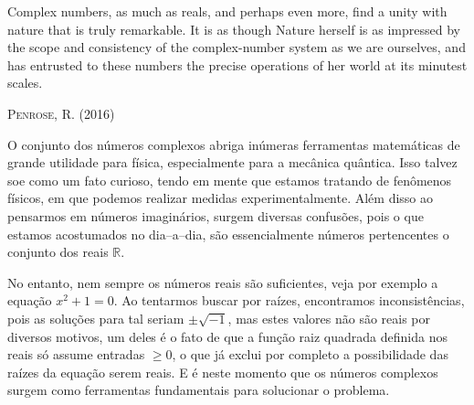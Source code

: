 \epigraph{Complex numbers, as much as reals, and perhaps even more, find a unity with nature that is truly remarkable. It is as though Nature herself is as impressed by the scope and consistency of the complex-number system as we are ourselves, and has entrusted to these numbers the precise operations of her world at its minutest scales.}{{\scshape Penrose, R. (2016)}}

O conjunto dos números complexos abriga inúmeras ferramentas matemáticas de grande utilidade para física, especialmente para a mecânica quântica. Isso talvez soe como um fato curioso, tendo em mente que estamos tratando de fenômenos físicos, em que podemos realizar medidas experimentalmente. Além disso ao pensarmos em números imaginários, surgem diversas confusões, pois o que estamos acostumados no dia--a--dia, são essencialmente números pertencentes o conjunto dos reais $\mathbb{R}$.

No entanto, nem sempre os números reais são suficientes, veja por exemplo a equação $x^2 + 1 = 0$. Ao tentarmos buscar por raízes, encontramos inconsistências, pois as soluções para tal seriam $\pm\sqrt{-1}$, mas estes valores não são reais por diversos motivos, um deles é o fato de que a função raiz quadrada definida nos reais só assume entradas $\geqslant 0$, o que já exclui por completo a possibilidade das raízes da equação serem reais. E é neste momento que os números complexos surgem como ferramentas fundamentais para solucionar o problema.
